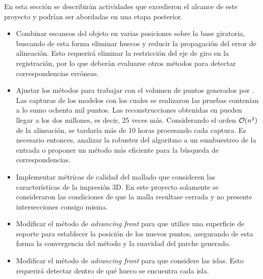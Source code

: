 En esta sección se describirán actividades que excedieron el alcance de este proyecto
y podrían ser abordadas en una etapa posterior.

\begin{itemize}
	\item Combinar escaneos del objeto en varias posiciones sobre la base giratoria,
		buscando de esta forma eliminar huecos y reducir la propagación del error de alineación.
		Esto requerirá eliminar la restricción del eje de giro en la
		registración, por lo que deberán evaluarse otros métodos para detectar
		correspondencias erróneas.
	\item Ajustar los métodos para trabajar con el volumen de puntos generados
		por \cite{Pancho}.  Las capturas de los modelos con los cuales se
		realizaron las pruebas contenían a lo sumo ochenta mil puntos. Las
		reconstrucciones obtenidas en \cite{Pancho} pueden llegar a los
		dos millones, es decir, 25 veces más.
		Considerando el orden $\mathcal{O}(n^2)$ de la alineación,
		se tardaría más de 10 horas procesando cada captura.
		Es necesario entonces, analizar la robustez del algoritmo a un sumbuestreo de la entrada
		o proponer un método más eficiente para la búsqueda de correspondencias.
	\item Implementar métricas de calidad del mallado que consideren las
		características de la impresión 3D.
		En este proyecto solamente se consideraron las condiciones de que la malla
		resultase cerrada y no presente intersecciones consigo misma.
	\item Modificar el método de \emph{advancing front} para que utilice una
		superficie de soporte para establecer la posición de los nuevos puntos,
		asegurando de esta forma la convergencia del método y la suavidad del
		parche generado.
	\item Modificar el método de \emph{advancing front} para que considere las islas.
		Esto requerirá detectar dentro de qué hueco se encuentra cada isla.
\end{itemize}
